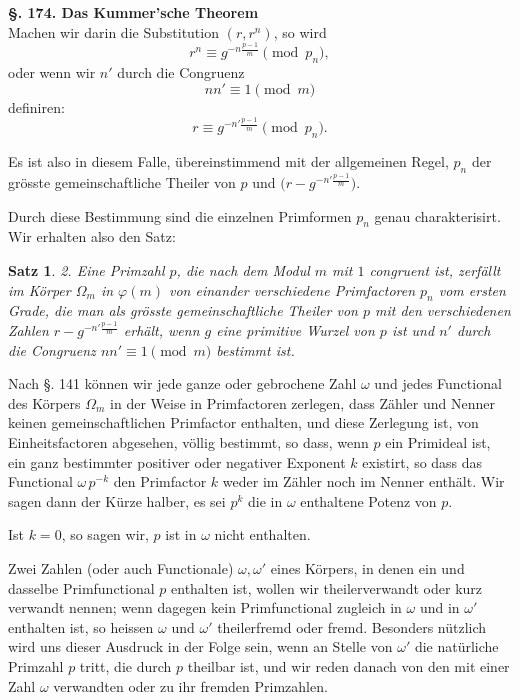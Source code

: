 \documentclass[12pt,a4paper]{article}
\newtheorem*{satz}{Satz}
\begin{document}
\bigskip\noindent\textbf{\S. 174. Das Kummer'sche Theorem}\\[4pt]

Machen wir darin die Substitution $(r, r^n)$, so wird
\begin{equation}\label{eq:14}
r^n \equiv g^{-n\frac{p-1}{m}} \pmod{p_n},
\end{equation}
oder wenn wir $n'$ durch die Congruenz
\begin{equation}\label{eq:15}
nn' \equiv 1 \pmod{m}
\end{equation}
definiren:
\begin{equation}\label{eq:16}
r \equiv g^{-n'\frac{p-1}{m}} \pmod{p_n}.
\end{equation}

Es ist also in diesem Falle, übereinstimmend mit der allgemeinen Regel, $p_n$ der grösste gemeinschaftliche Theiler von $p$ und $\bigl(r - g^{-n'\frac{p-1}{m}}\bigr)$.

Durch diese Bestimmung sind die einzelnen Primformen $p_n$ genau charakterisirt. Wir erhalten also den Satz:

\begin{satz}
2. Eine Primzahl $p$, die nach dem Modul $m$ mit $1$ congruent ist, zerfällt im Körper $\Omega_m$ in $\varphi(m)$ von einander verschiedene Primfactoren $p_n$ vom ersten Grade, die man als grösste gemeinschaftliche Theiler von $p$ mit den verschiedenen Zahlen $r - g^{-n'\frac{p-1}{m}}$ erhält, wenn $g$ eine primitive Wurzel von $p$ ist und $n'$ durch die Congruenz $nn' \equiv 1 \pmod{m}$ bestimmt ist.
\end{satz}

Nach \S. 141 können wir jede ganze oder gebrochene Zahl $\omega$ und jedes Functional des Körpers $\Omega_m$ in der Weise in Primfactoren zerlegen, dass Zähler und Nenner keinen gemeinschaftlichen Primfactor enthalten, und diese Zerlegung ist, von Einheitsfactoren abgesehen, völlig bestimmt, so dass, wenn $p$ ein Primideal ist, ein ganz bestimmter positiver oder negativer Exponent $k$ existirt, so dass das Functional $\omega\, p^{-k}$ den Primfactor $k$ weder im Zähler noch im Nenner enthält. Wir sagen dann der Kürze halber, es sei $p^k$ die in $\omega$ enthaltene Potenz von $p$.

Ist $k = 0$, so sagen wir, $p$ ist in $\omega$ nicht enthalten.

Zwei Zahlen (oder auch Functionale) $\omega, \omega'$ eines Körpers, in denen ein und dasselbe Primfunctional $p$ enthalten ist, wollen wir theilerverwandt oder kurz verwandt nennen; wenn dagegen kein Primfunctional zugleich in $\omega$ und in $\omega'$ enthalten ist, so heissen $\omega$ und $\omega'$ theilerfremd oder fremd. Besonders nützlich wird uns dieser Ausdruck in der Folge sein, wenn an Stelle von $\omega'$ die natürliche Primzahl $p$ tritt, die durch $p$ theilbar ist, und wir reden danach von den mit einer Zahl $\omega$ verwandten oder zu ihr fremden Primzahlen.
\end{document}
